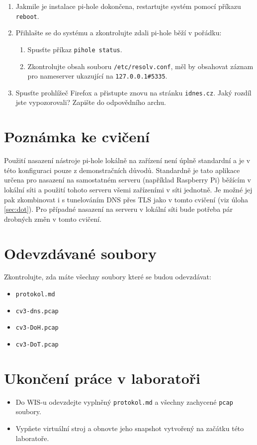 \begin{enumerate}
\begin{enumerate}
    \end{enumerate}
    \item Jakmile je instalace pi-hole dokončena, restartujte systém pomocí příkazu \texttt{reboot}.
    \item Přihlašte se do systému a zkontrolujte zdali pi-hole běží v pořádku:
    \begin{enumerate}
        \item Spusťte příkaz \texttt{pihole status}.
        \item Zkontrolujte obsah souboru \texttt{/etc/resolv.conf}, měl by obsahovat záznam pro nameserver ukazující na \texttt{127.0.0.1\#5335}.
    \end{enumerate}
    \item Spusťte prohlížeč Firefox a přistupte znovu na stránku \texttt{idnes.cz}. Jaký rozdíl jste vypozorovali? Zapište do odpovědního archu.
\end{enumerate}

\section*{Poznámka ke cvičení}
Použití nasazení nástroje pi-hole lokálně na zařízení není úplně standardní a je v této konfiguraci pouze z demonstračních důvodů. Standardně je tato aplikace určena pro nasazení na samostatném serveru (například Raspberry Pi) běžícím v lokální síti a použití tohoto serveru všemi zařízeními v síti jednotně. Je možné jej pak zkombinovat i s tunelováním DNS přes TLS jako v tomto cvičení (viz úloha \ref{sec:dot}). Pro případné nasazení na serveru v lokální síti bude potřeba pár drobných změn v tomto cvičení.

\section*{Odevzdávané soubory}
Zkontrolujte, zda máte všechny soubory které se budou odevzdávat:
\begin{itemize}
  \item \texttt{protokol.md}
  \item \texttt{cv3-dns.pcap}
  \item \texttt{cv3-DoH.pcap}
  \item \texttt{cv3-DoT.pcap}
\end{itemize}

\section*{Ukončení práce v laboratoři}
\begin{itemize}
	\item Do WIS-u odevzdejte vyplněný \texttt{protokol.md} a všechny zachycené \texttt{pcap} soubory.
	\item Vypňete virtuální stroj a obnovte jeho snapshot vytvořený na začátku této laboratoře.
\end{itemize}
